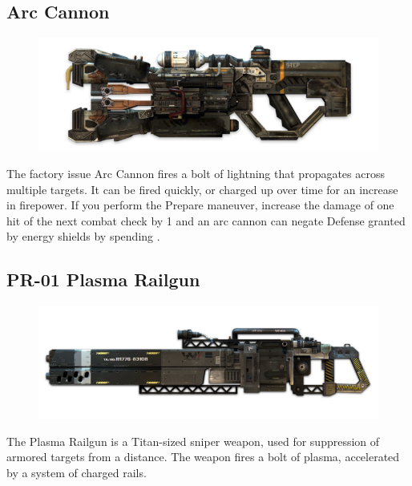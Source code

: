 \documentclass[9pt, openany]{extbook}
\begin{document}
\subsection{Arc Cannon}
\begin{figure}
\vspace*{-2em}
\includegraphics[width=\linewidth]{ArcCannon}
\end{figure}

The factory issue Arc Cannon fires a bolt of lightning that propagates across multiple targets. It can be fired quickly, or charged up over time for an increase in firepower. If you perform the Prepare maneuver, increase the damage of one hit of the next combat check by 1 and an arc cannon can negate Defense granted by energy shields by spending \Advantage\Advantage.

\subsection{PR-01 Plasma Railgun}
\begin{figure}
\vspace*{-2em}
\includegraphics[width=\linewidth]{PlasmaRailgun}
\end{figure}

The Plasma Railgun is a Titan-sized sniper weapon, used for suppression of armored targets from a distance. The weapon fires a bolt of plasma, accelerated by a system of charged rails.
\end{document}
